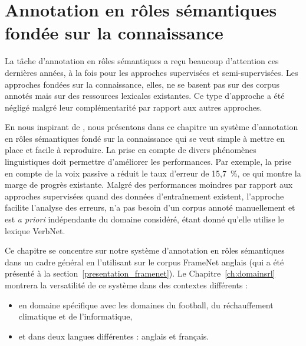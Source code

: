 \chapter{Annotation en rôles sémantiques fondée sur la connaissance}
\label{ch:srl}



La tâche d'annotation en rôles sémantiques a reçu beaucoup d'attention ces
dernières années, à la fois pour les approches supervisées et semi-supervisées.
Les approches fondées sur la connaissance, elles, ne se basent pas sur des
corpus annotés mais sur des ressources lexicales existantes. Ce type d'approche
a été négligé malgré leur complémentarité par rapport aux autres approches.

En nous inspirant de \cite{swier2004unsupervised,swier2005exploiting}, nous
présentons dans ce chapitre un système d'annotation en rôles sémantiques fondé
sur la connaissance qui se veut simple à mettre en place et facile à
reproduire. La prise en compte de divers phénomènes linguistiques doit
permettre d'améliorer les performances. Par exemple, la prise en compte de la
voix passive a réduit le taux d'erreur de 15,7~\%, ce qui montre la marge de
progrès existante. Malgré des performances moindres par rapport aux approches
supervisées quand des données d'entraînement existent, l'approche facilite
l'analyse des erreurs, n'a pas besoin d'un corpus annoté manuellement et est
\textit{a priori} indépendante du domaine considéré, étant donné qu'elle
utilise le lexique VerbNet.

Ce chapitre se concentre sur notre système d'annotation en rôles sémantiques
dans un cadre général en l'utilisant sur le corpus FrameNet anglais (qui a été
présenté à la section~\ref{presentation_framenet}). Le
Chapitre~\ref{ch:domainsrl} montrera la versatilité de ce système dans des
contextes différents :
\begin{itemize}
    \item en domaine spécifique avec les domaines du football, du
réchauffement climatique et de l'informatique,
    \item et dans deux langues différentes : anglais et français.
\end{itemize}


